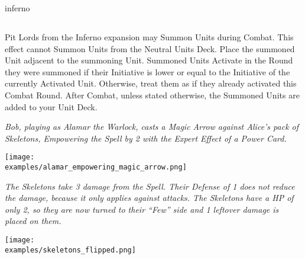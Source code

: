 \begin{multicols*}{2}

\begin{expansion}[before=\vspace*{-11mm}]{inferno}
  \subsection*{}
  Pit Lords from the Inferno expansion may Summon Units during Combat.
  This effect cannot Summon Units from the Neutral Units Deck.
  Place the summoned Unit adjacent to the summoning Unit.
  Summoned Units Activate in the Round they were summoned if their Initiative is lower or equal to the Initiative of the currently Activated Unit.
  Otherwise, treat them as if they already activated this Combat Round.
  After Combat, unless stated otherwise, the Summoned Units are added to your Unit Deck.
\end{expansion}
\vspace*{\fill}

\columnbreak
{}

\textit{Bob, playing as Alamar the Warlock, casts a Magic Arrow against Alice's pack of Skeletons, Empowering  the Spell by 2 with the Expert  Effect  of a Power Card.}

\medskip

\texttt{[image: \\examples/alamar\_empowering\_magic\_arrow.png]}

\medskip

\textit{The Skeletons take 3 damage  from the Spell.
  Their Defense  of 1 does not reduce the damage, because it only applies against attacks.
  The Skeletons have a HP  of only 2, so they are now turned to their ``Few'' side and 1 leftover damage  is placed on them.
}

\bigskip

\texttt{[image: \\examples/skeletons\_flipped.png]}

\end{multicols*}
